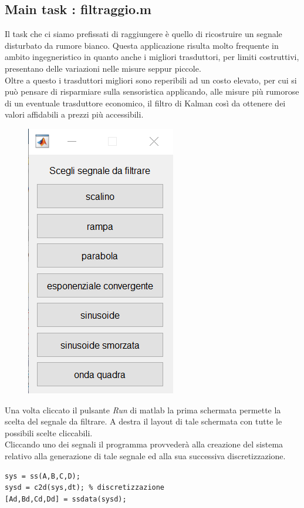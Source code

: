 \subsection{Main task : filtraggio.m}
Il task che ci siamo prefissati di raggiungere è quello di ricostruire un segnale disturbato da rumore bianco. Questa applicazione risulta molto frequente in ambito ingegneristico in quanto anche i migliori trasduttori, per limiti costruttivi, presentano delle variazioni nelle misure seppur piccole.\\
Oltre a questo i trasduttori migliori sono reperibili ad un costo elevato, per cui si può pensare di risparmiare sulla sensoristica applicando, alle misure più rumorose di un eventuale trasduttore economico, il filtro di Kalman così da ottenere dei valori affidabili a prezzi più accessibili.
\\
\begin{figure}
\centering
\includegraphics[scale=.7]{immaginiMain/mainfilterPOSS.png} 
\end{figure}
Una volta cliccato il pulsante \textit{Run} di matlab la prima schermata permette la scelta del segnale da filtrare.
A destra il layout di tale schermata con tutte le possibili scelte cliccabili.\\
Cliccando uno dei segnali il programma provvederà alla creazione del sistema relativo alla generazione di tale segnale ed alla sua successiva discretizzazione.
\begin{lstlisting}[frame=single]
sys = ss(A,B,C,D);
sysd = c2d(sys,dt); % discretizzazione
[Ad,Bd,Cd,Dd] = ssdata(sysd);
\end{lstlisting}
